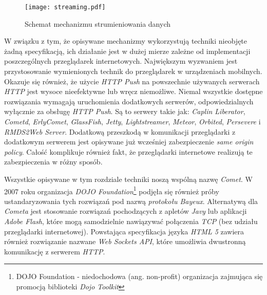 \documentclass[a4paper,12pt]{article}
\begin{document}
\begin{figure}[ht]
  \begin{center}
    \texttt{[image: streaming.pdf]}
  \end{center}
  \caption{Schemat mechanizmu strumieniowania danych}
  \label{streaming}
\end{figure}

W związku z tym, że opisywane mechanizmy wykorzystują techniki
nieobjęte żadną specyfikacją, ich działanie jest w dużej mierze
zależne od implementacji poszczególnych przeglądarek
internetowych. Największym wyzwaniem jest przystosowanie wymienionych
technik do przeglądarek w urządzeniach mobilnych. Okazuje się również,
że użycie \emph{HTTP Push} na powszechnie używanych serwerach
\emph{HTTP} jest wysoce nieefektywne lub wręcz niemożliwe. Niemal
wszystkie dostępne rozwiązania wymagają uruchomienia dodatkowych
serwerów, odpowiedzialnych wyłącznie za obsługę \emph{HTTP Push}. Są
to serwery takie jak: \emph{Caplin Liberator}, \emph{Cometd},
\emph{ErlyComet}, \emph{GlassFish}, \emph{Jetty},
\emph{Lightstreamer}, \emph{Meteor}, \emph{Orbited}, \emph{Persevere}
i \emph{RMDS2Web Server}\cite{cometmaturity}. Dodatkową przeszkodą w
komunikacji przeglądarki z dodatkowym serwerem jest opisywane już
wcześniej zabezpieczenie \emph{same origin policy}. Całość komplikuje
również fakt, że przeglądarki internetowe realizują te zabezpieczenia
w różny sposób\cite{xssinfo}.

Wszystkie opisywane w tym rozdziale techniki noszą wspólną nazwę
\emph{Comet}\cite{comet}. W 2007 roku organizacja \emph{DOJO
  Foundation}\footnote{DOJO Foundation - niedochodowa
  (ang. non-profit) organizacja zajmująca się promocją biblioteki
  \emph{Dojo Toolkit}} podjęła się również próby ustandaryzowania tych
rozwiązań pod nazwą \emph{protokołu Bayeux}\cite{bayeux}. Alternatywą
dla \emph{Cometa} jest stosowanie rozwiązań pochodzących z apletów
\emph{Javy} lub aplikacji \emph{Adobe Flash}, które mogą samodzielnie
nawiązywać połączenia \emph{TCP} (bez udziału przeglądarki
internetowej). Powstająca specyfikacja języka \emph{HTML 5} zawiera
również rozwiązanie nazwane \emph{Web Sockets API}, które umożliwia
dwustronną komunikację z serwerem \emph{HTTP}\cite{websockets}.
\end{document}
